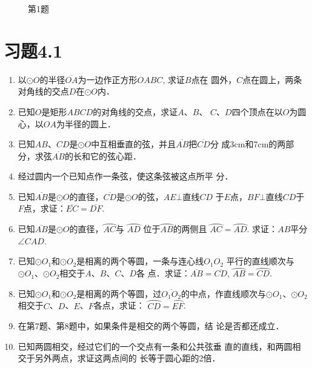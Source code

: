\begin{figure}[htp]
    \centering
{}
    \caption*{第1题}
\end{figure}

\section*{习题4.1}
\begin{enumerate}
\item 以$\odot O$的半径$\overline{OA}$为一边作正方形$OABC$, 求证$B$点在
圆外，$C$点在圆上，两条对角线的交点$D$在$\odot O$内．
\item 已知$O$是矩形$ABCD$的对角线的交点，求证$A$、$B$、
$C$、$D$四个顶点在以$O$为圆心，以$OA$为半径的圆上．
\item 已知$AB$、$CD$是$\odot O$中互相垂直的弦，并且$\overline{AB}$把$\overline{CD}$分
成3cm和7cm的两部分，求弦$\overline{AB}$的长和它的弦心距．
\item 经过圆内一个已知点作一条弦，使这条弦被这点所平
分．
\item 已知$\overline{AB}$是$\odot O$的直径，$\overline{CD}$是$\odot O$的弦，$AE\bot $直线$CD$
于$E$点，$BF\bot $直线$CD$于$F$点，求证：$\overline{EC}=\overline{DF}$.
\item 已知$\overline{AB}$是$\odot O$的直径，$\wideparen{AC}$与
$\wideparen{AD}$
位于$\wideparen{AB}$的两侧且
$\wideparen{AC}=\wideparen{AD}$. 求证：$AB$平分$\angle CAD$.
\item 已知$\odot O_1$和$\odot O_2$是相离的两个等圆，一条与连心线$O_1O_2$
平行的直线顺次与$\odot O_1$、$\odot O_2$相交于$A$、$B$、$C$、$D$各
点．求证：$\overline{AB}=\overline{CD}$, $\wideparen{AB}=\wideparen{CD}$.
\item 已知$\odot O_1$和$\odot O_2$是相离的两个等圆，过$\overline{O_1O_2}$的中点，作直线顺次与$\odot O_1$、$\odot O_2$相交于$C$、$D$、$E$、$F$各点，求证：
$\wideparen{CD}=\wideparen{EF}$.
\item 在第7题、第8题中，如果条件是相交的两个等圆，结
论是否都还成立．
\item 已知两圆相交，经过它们的一个交点有一条和公共弦垂
直的直线，和两圆相交于另外两点，求证这两点间的
长等于圆心距的2倍．
\end{enumerate}

